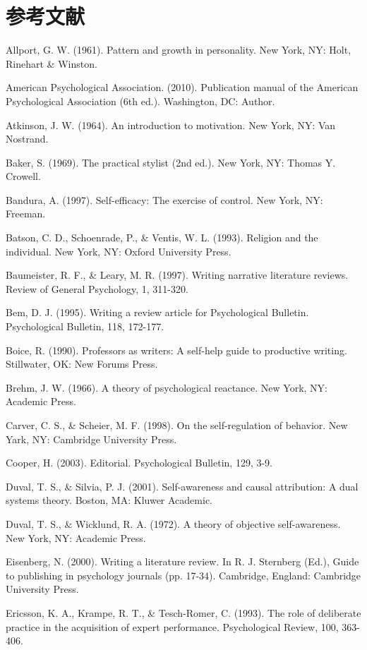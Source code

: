 \documentclass[lang=cn,newtx,14pt,scheme=chinese]{elegantbook}
\begin{document}
\chapter{参考文献}
Allport, G. W. (1961). Pattern and growth in personality. New York, NY: Holt, Rinehart \& Winston.

American Psychological Association. (2010). Publication manual of the American Psychological Association (6th ed.). Washington, DC: Author.

Atkinson, J. W. (1964). An introduction to motivation. New York, NY: Van Nostrand.

Baker, S. (1969). The practical stylist (2nd ed.). New York, NY: Thomas Y. Crowell.

Bandura, A. (1997). Self-efficacy: The exercise of control. New York, NY: Freeman.

Batson, C. D., Schoenrade, P., \& Ventis, W. L. (1993). Religion and the individual. New York, NY: Oxford University Press.

Baumeister, R. F., \& Leary, M. R. (1997). Writing narrative literature reviews. Review of General Psychology, 1, 311-320.

Bem, D. J. (1995). Writing a review article for Psychological Bulletin. Psychological Bulletin, 118, 172-177.

Boice, R. (1990). Professors as writers: A self-help guide to productive writing. Stillwater, OK: New Forums Press.

Brehm, J. W. (1966). A theory of psychological reactance. New York, NY: Academic Press.

Carver, C. S., \& Scheier, M. F. (1998). On the self-regulation of behavior. New Yark, NY: Cambridge University Press.

Cooper, H. (2003). Editorial. Psychological Bulletin, 129, 3-9.

Duval, T. S., \& Silvia, P. J. (2001). Self-awareness and causal attribution: A dual systems theory. Boston, MA: Kluwer Academic.

Duval, T. S., \& Wicklund, R. A. (1972). A theory of objective self-awareness. New York, NY: Academic Press.

Eisenberg, N. (2000). Writing a literature review. In R. J. Sternberg (Ed.), Guide to publishing in psychology journals (pp. 17-34). Cambridge, England: Cambridge University Press.

Ericsson, K. A., Krampe, R. T., \& Tesch-Romer, C. (1993). The role of deliberate practice in the acquisition of expert performance. Psychological Review, 100, 363-406.
\end{document}
